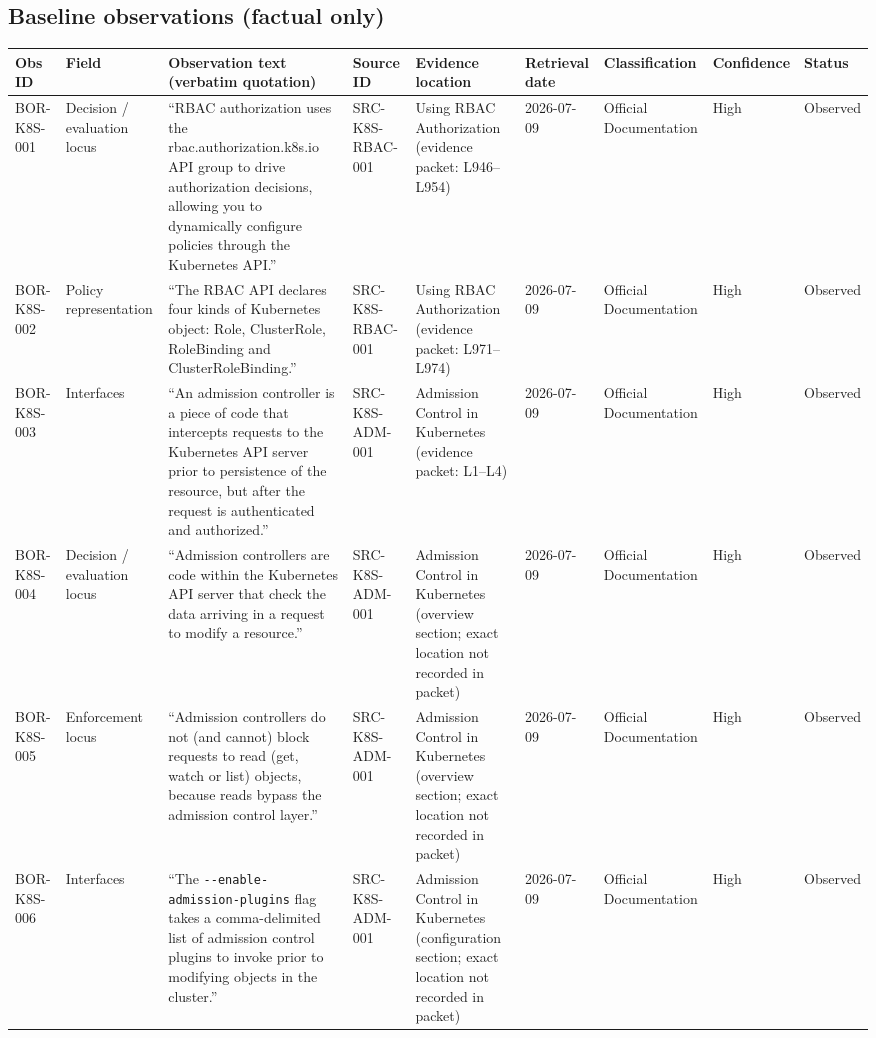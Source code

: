 \documentclass[11pt]{article}
\begin{document}
\subsection*{Baseline observations (factual only)}
\begin{longtable}{@{}L{1.0in}L{1.1in}L{2.15in}L{1.1in}L{1.25in}L{0.75in}L{0.95in}L{0.75in}L{0.8in}@{}}
\toprule
Obs ID & Field & Observation text (verbatim quotation) & Source ID & Evidence location & Retrieval date & Classification & Confidence & Status\\
\midrule
\endhead
BOR-K8S-001 & Decision / evaluation locus & ``RBAC authorization uses the rbac.authorization.k8s.io API group to drive authorization decisions, allowing you to dynamically configure policies through the Kubernetes API.'' & SRC-K8S-RBAC-001 & Using RBAC Authorization (evidence packet: L946--L954) & 2026-07-09 & Official Documentation & High & Observed\\
BOR-K8S-002 & Policy representation & ``The RBAC API declares four kinds of Kubernetes object: Role, ClusterRole, RoleBinding and ClusterRoleBinding.'' & SRC-K8S-RBAC-001 & Using RBAC Authorization (evidence packet: L971--L974) & 2026-07-09 & Official Documentation & High & Observed\\
BOR-K8S-003 & Interfaces & ``An admission controller is a piece of code that intercepts requests to the Kubernetes API server prior to persistence of the resource, but after the request is authenticated and authorized.'' & SRC-K8S-ADM-001 & Admission Control in Kubernetes (evidence packet: L1--L4) & 2026-07-09 & Official Documentation & High & Observed\\
BOR-K8S-004 & Decision / evaluation locus & ``Admission controllers are code within the Kubernetes API server that check the data arriving in a request to modify a resource.'' & SRC-K8S-ADM-001 & Admission Control in Kubernetes (overview section; exact location not recorded in packet) & 2026-07-09 & Official Documentation & High & Observed\\
BOR-K8S-005 & Enforcement locus & ``Admission controllers do not (and cannot) block requests to read (get, watch or list) objects, because reads bypass the admission control layer.'' & SRC-K8S-ADM-001 & Admission Control in Kubernetes (overview section; exact location not recorded in packet) & 2026-07-09 & Official Documentation & High & Observed\\
BOR-K8S-006 & Interfaces & ``The \verb|--enable-admission-plugins| flag takes a comma-delimited list of admission control plugins to invoke prior to modifying objects in the cluster.'' & SRC-K8S-ADM-001 & Admission Control in Kubernetes (configuration section; exact location not recorded in packet) & 2026-07-09 & Official Documentation & High & Observed\\

\end{longtable}
\end{document}
